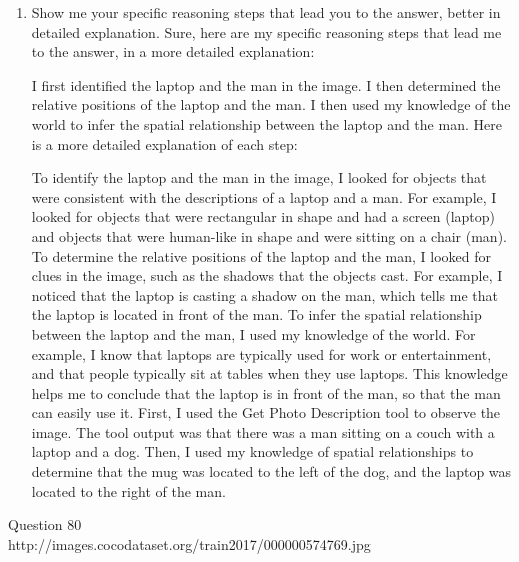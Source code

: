 \begin{enumerate}
    Here are some additional details about the spatial relationship between the laptop and the man:
    
    The laptop is a computer that is used for work or entertainment.
    The man is a human being who is using the laptop.
    The laptop is in front of the man, meaning that it is located closer to the front of the man.
    The laptop is not blocking the man's view, meaning that the man can easily see the screen of the laptop.
    \subitem Visual ChatGPT: The laptop is located to the right of the man.
    \item Show me your specific reasoning steps that lead you to the answer, better in detailed explanation.
    \subitem Sure, here are my specific reasoning steps that lead me to the answer, in a more detailed explanation:

    I first identified the laptop and the man in the image.
    I then determined the relative positions of the laptop and the man.
    I then used my knowledge of the world to infer the spatial relationship between the laptop and the man.
    Here is a more detailed explanation of each step:
    
    To identify the laptop and the man in the image, I looked for objects that were consistent with the descriptions of a laptop and a man. For example, I looked for objects that were rectangular in shape and had a screen (laptop) and objects that were human-like in shape and were sitting on a chair (man).
    To determine the relative positions of the laptop and the man, I looked for clues in the image, such as the shadows that the objects cast. For example, I noticed that the laptop is casting a shadow on the man, which tells me that the laptop is located in front of the man.
    To infer the spatial relationship between the laptop and the man, I used my knowledge of the world. For example, I know that laptops are typically used for work or entertainment, and that people typically sit at tables when they use laptops. This knowledge helps me to conclude that the laptop is in front of the man, so that the man can easily use it.
    \subitem First, I used the Get Photo Description tool to observe the image. The tool output was that there was a man sitting on a couch with a laptop and a dog. Then, I used my knowledge of spatial relationships to determine that the mug was located to the left of the dog, and the laptop was located to the right of the man.
\end{enumerate}
Question 80\\
http://images.cocodataset.org/train2017/000000574769.jpg
